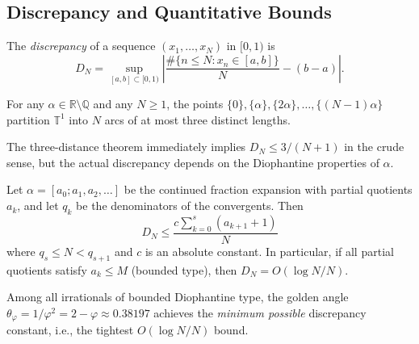 \subsection{Discrepancy and Quantitative Bounds}\label{subsec:ch18-discrepancy}

The \emph{discrepancy} of a sequence $(x_1,\ldots,x_N)$ in $[0,1)$ is
\begin{equation}\label{eq:discrepancy}
  D_N = \sup_{[a,b]\subset[0,1)} \left|\frac{\#\{n \le N : x_n \in [a,b]\}}{N} - (b-a)\right|.
\end{equation}

\begin{theorem}\label{thm:three-distance}
For any $\alpha \in \mathbb{R}\setminus\mathbb{Q}$ and any $N \ge 1$, the points
$\{0\}, \{\alpha\}, \{2\alpha\}, \ldots, \{(N-1)\alpha\}$ partition $\mathbb{T}^1$
into $N$ arcs of at most three distinct lengths.
\end{theorem}

The three-distance theorem immediately implies $D_N \le 3/(N+1)$ in the crude
sense, but the actual discrepancy depends on the Diophantine properties of $\alpha$.

\begin{theorem}\label{thm:discrepancy-cf}
Let $\alpha = [a_0; a_1, a_2, \ldots]$ be the continued fraction expansion
with partial quotients $a_k$, and let $q_k$ be the denominators of the convergents.
Then
\begin{equation}\label{eq:discrepancy-bound}
  D_N \le \frac{c \sum_{k=0}^{s} (a_{k+1}+1)}{N}
\end{equation}
where $q_s \le N < q_{s+1}$ and $c$ is an absolute constant.
In particular, if all partial quotients satisfy $a_k \le M$ (bounded type),
then $D_N = O(\log N / N)$.
\end{theorem}

\begin{corollary}
\label{cor:golden-discrepancy}
Among all irrationals of bounded Diophantine type,
the golden angle $\theta_\varphi = 1/\varphi^2 = 2 - \varphi \approx 0.38197$
achieves the \emph{minimum possible} discrepancy constant, i.e., the tightest
$O(\log N / N)$ bound.
\end{corollary}

